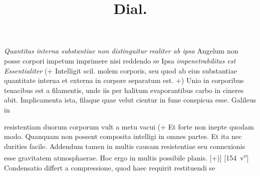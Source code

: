 \pend 
\pstart {}
\textit{Quantitas interna\protect{} substantiae non distinguitur realiter ab ipsa }
\pend 
\pstart {}  Angelum\protect{} non posse corpori impetum imprimere nisi reddendo se 
Ipsa \textit{impenetrabilitas est Essentialiter } (+ Intelligit scil. molem corporis, seu quod ab eius substantiae quantitate interna et externa\protect{} in corpore separatum est. +)   Unio in corporibus tenacibus est a filamentis, unde iis per halitum\protect{} evaporantibus carbo in cineres abit. Implicamenta ista, filaque quae velut cientur in  fune\protect{} conspicua esse. Galileus in \title{Dial.} resistentiam duorum corporum vult a metu vacui\protect{}  (+ Et forte non inepte quodam modo. Quanquam non possent composita intelligi in omnes partes. Et ita nec durities facile. Addendum tamen in multis causam resistentiae seu connexionis esse gravitatem atmosphaerae\protect{}. Hoc ergo in multis possibile planis. [+)]
[154~v\textsuperscript{o}]
\pend%
\pstart%
%
%
%
% 
Condensatio\protect{} differt a compressione\protect{}, quod haec requirit restituendi se 
